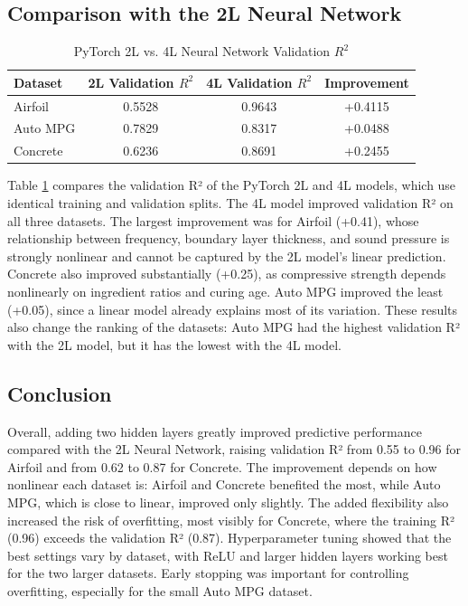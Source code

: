 \subsection{Comparison with the 2L Neural Network}
\begin{table}[H]
    \centering
    \caption{PyTorch 2L vs. 4L Neural Network Validation $R^2$}
    \label{tab:pytorch_2l_vs_4l}
    \begin{tabular}{lccc}
        \hline
        \textbf{Dataset} & \textbf{2L Validation $R^2$} & \textbf{4L Validation $R^2$} & \textbf{Improvement} \\
        \hline
        Airfoil  & 0.5528 & 0.9643 & +0.4115 \\
        Auto MPG & 0.7829 & 0.8317 & +0.0488 \\
        Concrete & 0.6236 & 0.8691 & +0.2455 \\
        \hline
    \end{tabular}
\end{table}

Table \ref{tab:pytorch_2l_vs_4l} compares the validation R² of the PyTorch 2L and 4L models, which use identical training and validation splits. The 4L model improved validation R² on all three datasets. The largest improvement was for Airfoil (+0.41), whose relationship between frequency, boundary layer thickness, and sound pressure is strongly nonlinear and cannot be captured by the 2L model's linear prediction. Concrete also improved substantially (+0.25), as compressive strength depends nonlinearly on ingredient ratios and curing age. Auto MPG improved the least (+0.05), since a linear model already explains most of its variation. These results also change the ranking of the datasets: Auto MPG had the highest validation R² with the 2L model, but it has the lowest with the 4L model.

\subsection{Conclusion}
Overall, adding two hidden layers greatly improved predictive performance compared with the 2L Neural Network, raising validation R² from 0.55 to 0.96 for Airfoil and from 0.62 to 0.87 for Concrete. The improvement depends on how nonlinear each dataset is: Airfoil and Concrete benefited the most, while Auto MPG, which is close to linear, improved only slightly. The added flexibility also increased the risk of overfitting, most visibly for Concrete, where the training R² (0.96) exceeds the validation R² (0.87). Hyperparameter tuning showed that the best settings vary by dataset, with ReLU and larger hidden layers working best for the two larger datasets. Early stopping was important for controlling overfitting, especially for the small Auto MPG dataset.

